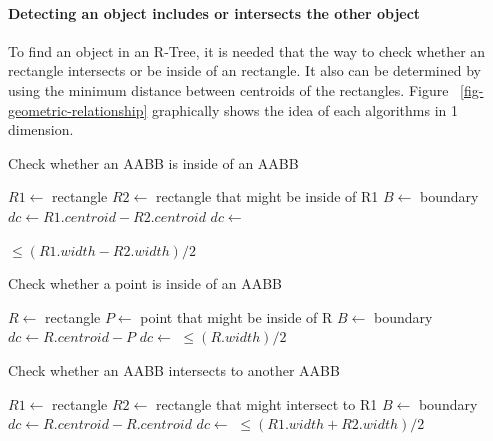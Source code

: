 \documentclass[10pt,letterpaper,twocolumn]{article}
\begin{document}
\paragraph{Detecting an object includes or intersects the other object}

To find an object in an R-Tree, it is needed that the way to check whether an
rectangle intersects or be inside of an rectangle.
It also can be determined by using the minimum distance between centroids of the
rectangles.
Figure ~\ref{fig-geometric-relationship} graphically shows the idea of each
algorithms in 1 dimension.

\begin{algorithm}
    \caption{Check whether an AABB is inside of an AABB}
    \begin{algorithmic}
        \State $R1 \gets$ rectangle
        \State $R2 \gets$ rectangle that might be inside of R1
        \State $B  \gets$ boundary
            \State $dc \gets R1.centroid - R2.centroid$
            \State $dc \gets$ 

            \State \Return {} $\leq (R1.width - R2.width) / 2$
        \EndFunction
     \end{algorithmic}
\end{algorithm}

\begin{algorithm}
    \caption{Check whether a point is inside of an AABB}
    \begin{algorithmic}
        \State $R \gets$ rectangle
        \State $P \gets$ point that might be inside of R
        \State $B \gets$ boundary
            \State $dc \gets R.centroid - P$
            \State $dc \gets$ 
            \State \Return {} $\leq (R.width) / 2$
        \EndFunction
     \end{algorithmic}
\end{algorithm}

\begin{algorithm}
    \caption{Check whether an AABB intersects to another AABB}
    \begin{algorithmic}
        \State $R1 \gets$ rectangle
        \State $R2 \gets$ rectangle that might intersect to R1
        \State $B  \gets$ boundary
            \State $dc \gets R.centroid - R.centroid$
            \State $dc \gets$ 
            \State \Return {} $\leq (R1.width + R2.width) / 2$
        \EndFunction
     \end{algorithmic}
\end{algorithm}
\end{document}
